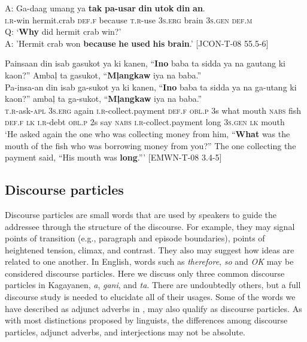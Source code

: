 \gll A: Ga-daag  umang  ya  \textbf{tak}  \textbf{pa-usar}  \textbf{din}  \textbf{utok}  \textbf{din}  \textbf{an}. \\
{} \textsc{i.r}-win  hermit.crab  \textsc{def.f}  because  \textsc{t.r}-use  3\textsc{s.erg}  brain  3\textsc{s.gen}  \textsc{def.m} \\

\glt Q: `\textbf{Why} did hermit crab win?' \\
A: 'Hermit crab won \textbf{because} \textbf{he} \textbf{used} \textbf{his} \textbf{brain}.' [JCON-T-08 55.5-6]
\z

\ea 
Painsaan  din  isab  gasukot  ya  ki  kanen, “\textbf{Ino}  baba  ta  sidda  ya  na  gautang  ki  kaon?” Ambaļ  ta  gasukot,  “\textbf{Mļangkaw}  iya  na  baba.” \\\smallskip
\gll Pa-insa-an  din  isab  ga-sukot  ya  ki  kanen, “\textbf{Ino}  baba  ta  sidda  ya  na  ga-utang  ki  kaon?” ambaļ  ta  ga-sukot,  “\textbf{Mļangkaw}  iya  na  baba.” \\
\textsc{t.r}-ask-\textsc{apl}  3\textsc{s.erg}  again  \textsc{i.r}-collect.payment  \textsc{def.f}  \textsc{obl.p}  3s what  mouth  \textsc{nabs}  fish  \textsc{def.f}  \textsc{lk}  \textsc{i.r}-debt  \textsc{obl.p}  2s say  \textsc{nabs}  \textsc{i.r}-collect.payment  long  3\textsc{s.gen}  \textsc{lk}  mouth \\
\glt `He asked again the one who was collecting money from him, “\textbf{What} was the mouth of the fish who was borrowing money from you?” The one collecting the payment said, “His mouth was \textbf{long}.”' [EMWN-T-08 3.4-5]
\z

\subsection{Discourse particles}
\label{bkm:Ref118460437} \label{sec:discourseparticles}
Discourse particles are small words that are used by speakers to guide the addressee through the structure of the discourse. For example, they may signal points of transition (e.g., paragraph and episode boundaries), points of heightened tension, climax, and contrast. They also may suggest how ideas are related to one another. In English, words such as \textit{therefore}, \textit{so} and \textit{OK} may be considered discourse particles. Here we discuss only three common discourse particles in Kagayanen, \textit{a}, \textit{gani}, and \textit{ta}. There are undoubtedly others, but a full discourse study is needed to elucidate all of their usages. Some of the words we have described as adjunct adverbs in ,  may also qualify as discourse particles. As with most distinctions proposed by linguists, the differences among discourse particles, adjunct adverbs, and interjections may not be absolute.


